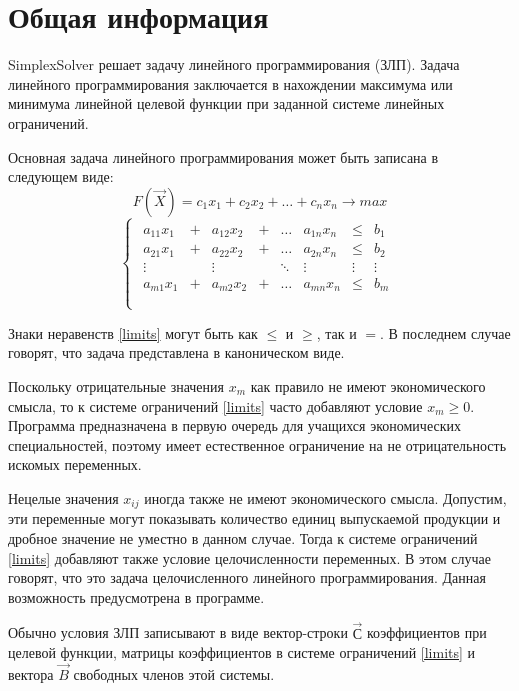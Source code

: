 \chapter{Общая информация}
SimplexSolver решает задачу линейного программирования (ЗЛП).
Задача линейного программирования заключается в нахождении
максимума или минимума линейной целевой функции при заданной системе линейных ограничений.

Основная задача линейного программирования может быть записана в следующем виде:
\begin{equation}
F(\vec{X}) = c_1 x_1 + c_2 x_2 + \hdots + c_n x_n \to max
\end{equation}
\begin{equation}
\label{limits}
\begin{cases}
\begin{matrix}
a_{11} x_1 & + & a_{12} x_2 & + & \hdots &a_{1n} x_n &\le & b_1 \\
a_{21} x_1 & + & a_{22} x_2 & + & \hdots &a_{2n} x_n &\le & b_2 \\
\vdots     & ~ & \vdots     & ~ & \ddots &\vdots     & \vdots & \vdots \\
a_{m1} x_1 & + & a_{m2} x_2 & + & \hdots &a_{mn} x_n &\le & b_m \\
\end{matrix} \\
\end{cases}
\end{equation}

Знаки неравенств \eqref{limits} могут быть как $\le$ и $\ge$, так и $=$.
В последнем случае говорят, что задача представлена в каноническом виде.

Поскольку отрицательные значения $x_{m}$ как правило не имеют экономического смысла,
то к системе ограничений \eqref{limits} часто добавляют условие $x_m \ge 0$. Программа предназначена в первую очередь для учащихся экономических специальностей, поэтому имеет естественное ограничение на не отрицательность искомых переменных.

Нецелые значения $x_{ij}$ иногда также не имеют экономического смысла. Допустим, эти переменные могут показывать количество единиц выпускаемой продукции и дробное значение не уместно в данном случае. Тогда к системе ограничений \eqref{limits} добавляют также условие целочисленности переменных. В этом случае говорят, что это задача целочисленного линейного программирования. Данная возможность предусмотрена в программе.

Обычно условия ЗЛП записывают в виде вектор-строки $\vec{С}$ коэффициентов при целевой функции, матрицы коэффициентов в системе ограничений \eqref{limits} и вектора $\vec{B}$ свободных членов этой системы.